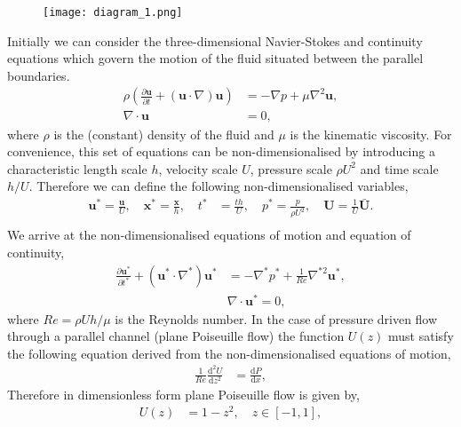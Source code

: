 \documentclass[a4paper, 12pt, twoside, openright]{article}
\numberwithin{equation}{section}
\begin{document}
\begin{figure}[H]
\centering
\texttt{[image: diagram\_1.png]}
\end{figure}

Initially we can consider the three-dimensional Navier-Stokes and continuity equations which govern the motion of the fluid situated between the parallel boundaries.
\begin{align}
\rho\left(\frac{\partial\mathbf{u}}{\partial t} + \left(\mathbf{u}\cdot\nabla\right)\mathbf{u}\right) &= - \nabla p + \mu\nabla^2\mathbf{u}, \\
\nabla \cdot \mathbf{u} &= 0, 
\end{align}
where $\rho$ is the (constant) density of the fluid and $\mu$ is the kinematic viscosity. For convenience, this set of equations can be non-dimensionalised by introducing a characteristic length scale $h$, velocity scale $U$, pressure scale $\rho U^2 $ and time scale $h/U$. Therefore we can define the following non-dimensionalised variables, 
\begin{align*} %
\mathbf{u}^* = \frac{\mathbf{u}}{U}, \quad \mathbf{x}^*=\frac{\mathbf{x}}{h}, \quad t^*&=\frac{th}{U}, \quad p^*=\frac{p}{\rho U^2}, \quad \mathbf{U}=\frac{1}{U}\mathbf{\bar U}. \\
\end{align*}
We arrive at the non-dimensionalised equations of motion and equation of continuity,
\begin{align}
\frac{\partial\mathbf{u}^*}{\partial t^*} + \left(\mathbf{u}^*\cdot \nabla^*\right)\mathbf{u}^* &= -\nabla^* p^* + \frac{1}{Re} \nabla^{*2} \mathbf{u}^*, \\
&\nabla \cdot \mathbf{u}^* = 0, 
\end{align}
where $ Re= \rho U h / \mu $ is the Reynolds number. In the case of pressure driven flow through a parallel channel (plane Poiseuille flow) the function $ U(z) $ must satisfy the following equation derived from the non-dimensionalised equations of motion,
\begin{align}
\frac{1}{Re}\frac{\mathrm{d}^2 U}{\mathrm{d} z^2} &= \frac{\mathrm{d} P}{\mathrm{d} x},
\end{align}  
Therefore in dimensionless form plane Poiseuille flow is given by,
\begin{align}
U(z) &= 1 - z^2,\quad z \in [-1,1],
\end{align}
\end{document}

